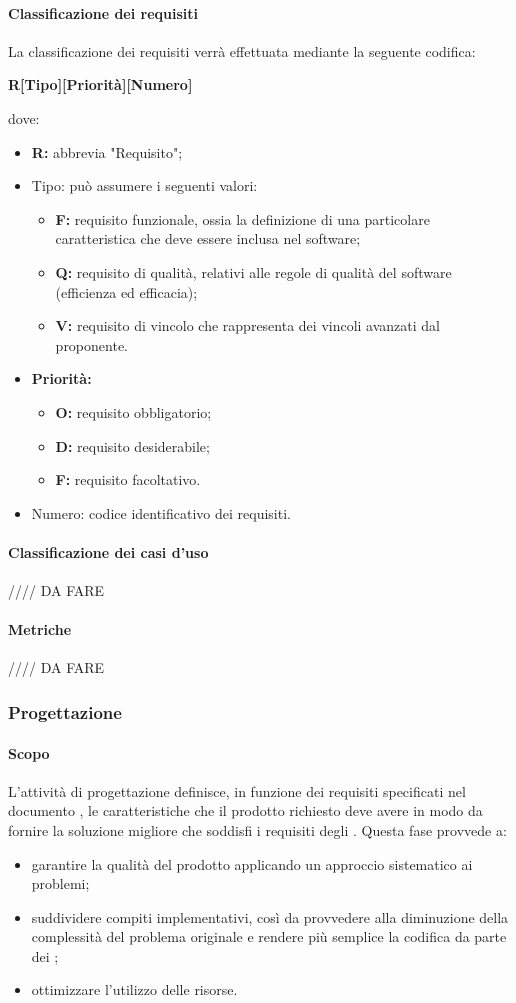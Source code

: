 \paragraph{Classificazione dei requisiti}
La classificazione dei requisiti verrà effettuata mediante la seguente codifica:\newline
\centerline{\textbf{R[Tipo][Priorità][Numero]}}\newline
dove:
\begin{itemize}
	\item \textbf{R:} abbrevia "Requisito";
	\item Tipo: può assumere i seguenti valori:
	\begin{itemize}
		\item \textbf{F:} requisito funzionale, ossia la definizione di una particolare caratteristica che deve essere inclusa nel software;
		\item \textbf{Q:} requisito di qualità, relativi alle regole di qualità del software (efficienza ed efficacia);
		\item \textbf{V:} requisito di vincolo che rappresenta dei vincoli avanzati dal proponente.
	\end{itemize}
	\item \textbf{Priorità:}
	\begin{itemize}
		\item \textbf{O:} requisito obbligatorio;
		\item \textbf{D:} requisito desiderabile;
		\item \textbf{F:} requisito facoltativo.
	\end{itemize}
	\item Numero: codice identificativo dei requisiti.
\end{itemize}
\paragraph{Classificazione dei casi d'uso}
//// DA FARE
\paragraph{Metriche}
//// DA FARE
\subsubsection{Progettazione}
\paragraph{Scopo}
L'attività di progettazione definisce, in funzione dei requisiti specificati nel documento \AdR{}, le caratteristiche che il prodotto richiesto deve avere in modo da fornire la soluzione migliore che soddisfi i requisiti degli . Questa fase provvede a:
\begin{itemize}
\item garantire la qualità del prodotto applicando un approccio sistematico ai problemi;
\item suddividere compiti implementativi, così da provvedere alla diminuzione della complessità del problema originale e rendere più semplice la codifica da parte dei \progrs{};
\item ottimizzare l'utilizzo delle risorse.
\end{itemize}

